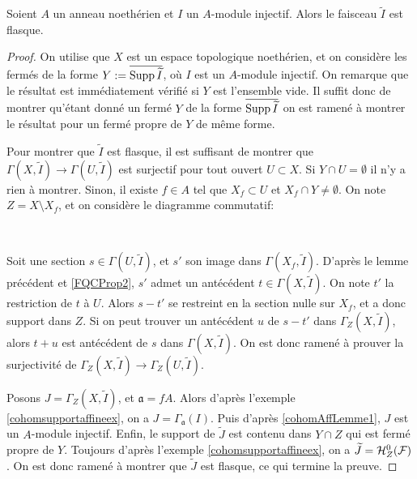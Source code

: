\begin{prop}\label{cohomAffProp1}
Soient $A$ un anneau noethérien et $I$ un $A$-module injectif. Alors le faisceau $\widetilde{I}$ est flasque.
\end{prop}
\begin{proof}
On utilise que $X$ est un espace topologique noethérien, et on considère les fermés de la forme $Y:=\overline{\operatorname{Supp} \widetilde{I}}$, où $I$ est un $A$-module injectif. On remarque que le résultat est immédiatement vérifié si $Y$ est l'ensemble vide. Il suffit donc de montrer qu'étant donné un fermé $Y$ de la forme $\overline{\operatorname{Supp} \widetilde{I}}$ on est ramené à montrer le résultat pour un fermé propre de $Y$ de même forme.

Pour montrer que $\widetilde{I}$ est flasque, il est suffisant de montrer que $\Gamma(X,\widetilde{I})\rightarrow\Gamma(U,\widetilde{I})$ est surjectif pour tout ouvert $U\subset X$. Si $Y\cap U=\emptyset$ il n'y a rien à montrer. Sinon, il existe $f\in A$ tel que $X_f\subset U$ et $X_f\cap Y\neq \emptyset$. On note $Z= X\setminus X_f$, et on considère le diagramme commutatif:

	\begin{center}
	\\
	\end{center}
Soit une section $s\in\Gamma(U,\widetilde{I})$, et $s'$ son image dans $\Gamma(X_f,\widetilde{I})$. D'après le lemme précédent et \ref{FQCProp2}, $s'$ admet un antécédent $t\in \Gamma(X,\widetilde{I})$. On note $t'$ la restriction de $t$ à $U$. Alors $s-t'$ se restreint en la section nulle sur $X_f$, et a donc support dans $Z$. Si on peut trouver un antécédent $u$ de $s-t'$ dans $\Gamma_Z(X,\widetilde{I})$, alors $t+u$ est antécédent de $s$ dans $\Gamma(X,\widetilde{I})$. On est donc ramené à prouver la surjectivité de $\Gamma_Z(X,\widetilde{I})\rightarrow\Gamma_Z(U,\widetilde{I})$.

Posons $J=\Gamma_Z(X,\widetilde{I})$, et $\mathfrak{a}=fA$. Alors d'après l'exemple \ref{cohomsupportaffineex}, on a $J=\Gamma_\mathfrak{a}(I)$. Puis d'après \ref{cohomAffLemme1}, $J$ est un $A$-module injectif. Enfin, le support de $\widetilde{J}$ est contenu dans $Y\cap Z$ qui est fermé propre de $Y$.  Toujours d'après l'exemple \ref{cohomsupportaffineex}, on a $\widetilde{J} = \mathcal{H} ^0 _Z(\mathcal{F})$. On est donc ramené à montrer que $\widetilde{J}$ est flasque, ce qui termine la preuve.
\end{proof}



